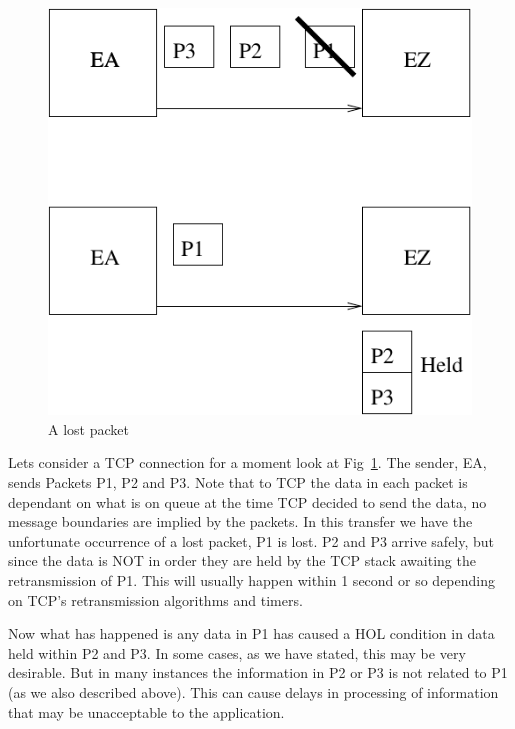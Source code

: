 \documentclass[conference]{IEEEtran}
\begin{document}
\begin{figure}
\includegraphics{lostpacket}
\caption{A lost packet}
\label{lost}
\end{figure}

Lets consider a TCP connection for a moment look at Fig~\ref{lost}. 
The sender, EA, sends Packets P1, P2 and P3. Note that to TCP the data
in each packet is dependant on what is on queue at the time TCP decided
to send the data, no message boundaries are implied by the packets. In this
transfer we have the unfortunate occurrence of a lost packet, P1 is lost. P2 and P3
arrive safely, but since the data is NOT in order they are held by the TCP stack
awaiting the retransmission of P1. This will usually happen within 1 second or so
depending on TCP's retransmission algorithms and timers.

Now what has happened is any data in P1 has caused a HOL condition in data
held within P2 and P3. In some cases, as we have stated, this may be very desirable.
But in many instances the information in P2 or P3 is not related to P1 (as we also
described above). This can cause delays in processing of information that may
be unacceptable to the application.
\end{document}
